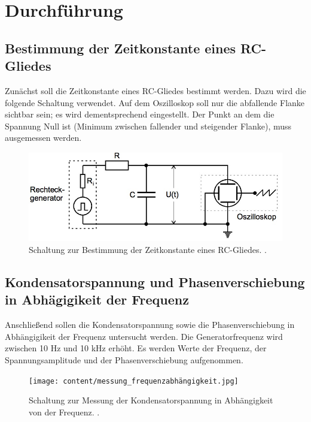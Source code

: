 \section{Durchführung}
\label{sec:Durchführung}
\subsection{Bestimmung der Zeitkonstante eines RC-Gliedes}
 Zunächst soll die Zeitkonstante eines RC-Gliedes bestimmt werden. Dazu wird die folgende Schaltung verwendet. Auf dem Oszilloskop soll nur die abfallende Flanke sichtbar sein; es wird dementsprechend eingestellt. Der Punkt an dem die Spannung Null ist (Minimum zwischen fallender und steigender Flanke), muss ausgemessen werden.

 \begin{figure}
   \centering
   \includegraphics[scale=0.5]{content/messung_zeitkonstante.jpg}
   \caption{Schaltung zur Bestimmung der Zeitkonstante eines RC-Gliedes. \cite{anleitung353}.}
   \label{fig:zeitkonstante}
 \end{figure}

\subsection{Kondensatorspannung und Phasenverschiebung in Abhägigikeit der Frequenz}
Anschließend sollen die Kondensatorspannung sowie die Phasenverschiebung in Abhängigikeit der Frequenz untersucht werden. Die Generatorfrequenz wird zwischen 10 \si{\Hz} und 10 \si{\kilo \Hz} erhöht. Es werden Werte der Frequenz, der Spannungsamplitude und der Phasenverschiebung aufgenommen.

\begin{figure}
  \centering
  \texttt{[image: content/messung\_frequenzabhängigkeit.jpg]}
  \caption{Schaltung zur Messung der Kondensatorspannung in Abhängigkeit von der Frequenz. \cite{anleitung353}.}
  \label{fig:kondensatorspannung}
\end{figure}

